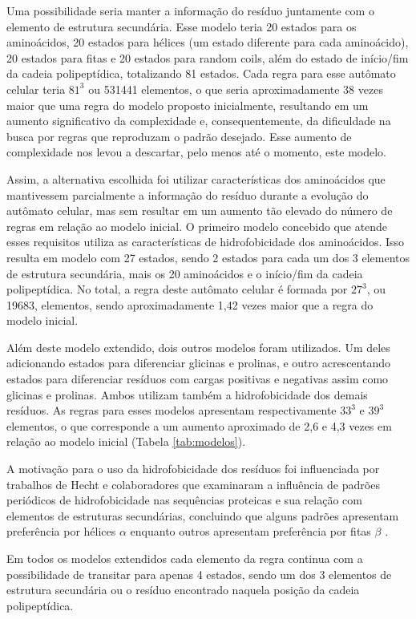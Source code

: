 Uma possibilidade seria manter a informação do resíduo juntamente com o elemento de estrutura secundária. Esse modelo teria 20 estados para os aminoácidos, 20 estados para hélices (um estado diferente para cada aminoácido), 20 estados para fitas e 20 estados para random coils, além do estado de início/fim da cadeia polipeptídica, totalizando 81 estados. Cada regra para esse autômato celular teria $81^3$  ou 531441 elementos, o que seria aproximadamente 38 vezes maior que uma regra do modelo proposto inicialmente, resultando em um aumento significativo da complexidade e, consequentemente, da dificuldade na busca por regras que reproduzam o padrão desejado. Esse aumento de complexidade nos levou a descartar, pelo menos até o momento, este modelo.

Assim, a alternativa escolhida foi utilizar características dos aminoácidos que mantivessem parcialmente a informação do resíduo durante a evolução do autômato celular, mas sem resultar em um aumento tão elevado do número de regras em relação ao modelo inicial. O primeiro modelo concebido que atende esses requisitos utiliza as características de hidrofobicidade dos aminoácidos. Isso resulta em modelo com 27 estados, sendo 2 estados para cada um dos 3 elementos de estrutura secundária, mais os 20 aminoácidos e o início/fim da cadeia polipeptídica. No total, a regra deste autômato celular é formada por  $27^3$, ou 19683, elementos, sendo aproximadamente 1,42 vezes maior que a regra do modelo inicial.

Além deste modelo extendido, dois outros modelos foram utilizados. Um deles adicionando estados para diferenciar glicinas e prolinas, e outro acrescentando estados para diferenciar resíduos com cargas positivas e negativas assim como glicinas e prolinas. Ambos utilizam também a hidrofobicidade dos demais resíduos. As regras para esses modelos apresentam  respectivamente $33^3$ e $39^3$ elementos, o que corresponde a um aumento aproximado de 2,6 e 4,3 vezes em relação ao modelo inicial (Tabela \ref{tab:modelos}). 

A motivação para o uso da hidrofobicidade dos resíduos foi influenciada por trabalhos de Hecht e colaboradores \cite{Xiong1995,West1995} que examinaram a influência de padrões periódicos de hidrofobicidade nas sequências proteicas e sua relação com elementos de estruturas secundárias, concluindo que alguns padrões apresentam preferência por hélices $\alpha$ enquanto outros apresentam preferência por fitas $\beta$ \cite{West1995}.

Em todos os modelos extendidos cada elemento da regra continua com a possibilidade de transitar para apenas 4 estados, sendo um dos 3 elementos de estrutura secundária ou o resíduo encontrado naquela posição da cadeia polipeptídica.

